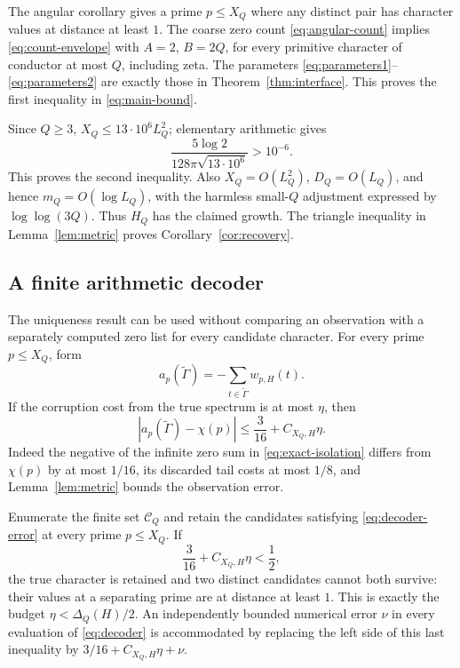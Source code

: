 \documentclass[11pt,letterpaper]{article}
\theoremstyle{definition}\newtheorem{definition}[theorem]{Definition}
\theoremstyle{remark}\newtheorem{remark}[theorem]{Remark}
\newcommand{\Ccal}{\mathcal C}
\begin{document}
The angular corollary gives a prime $p\le X_Q$ where any distinct
pair has character values at distance at least $1$. The coarse zero
count \eqref{eq:angular-count} implies \eqref{eq:count-envelope}
with $A=2$, $B=2Q$, for every primitive character of conductor at most
$Q$, including zeta. The parameters \eqref{eq:parameters1}--
\eqref{eq:parameters2} are exactly those in
Theorem~\ref{thm:interface}. This proves the first inequality in
\eqref{eq:main-bound}.

Since $Q\ge3$, $X_Q\le13\cdot10^6L_Q^2$; elementary arithmetic gives
\[
 \frac{5\log2}{128\pi\sqrt{13\cdot10^6}}>10^{-6}.
\]
This proves the second inequality. Also
$X_Q=O(L_Q^2)$, $D_Q=O(L_Q)$, and hence
$m_Q=O(\log L_Q)$, with the harmless small-$Q$ adjustment expressed by
$\log\log(3Q)$. Thus $H_Q$ has the claimed growth.
The triangle inequality in Lemma~\ref{lem:metric} proves
Corollary~\ref{cor:recovery}.

\subsection{A finite arithmetic decoder}

The uniqueness result can be used without comparing an observation
with a separately computed zero list for every candidate character.
For every prime $p\le X_Q$, form
\begin{equation}\label{eq:decoder}
 a_p(\widetilde\Gamma)=-\sum_{t\in\widetilde\Gamma}w_{p,H}(t).
\end{equation}
If the corruption cost from the true spectrum is at most $\eta$, then
\begin{equation}\label{eq:decoder-error}
 |a_p(\widetilde\Gamma)-\chi(p)|
 \le\frac3{16}+C_{X_Q,H}\eta.
\end{equation}
Indeed the negative of the infinite zero sum in \eqref{eq:exact-isolation} differs from
$\chi(p)$ by at most $1/16$, its discarded tail costs at most $1/8$,
and Lemma~\ref{lem:metric} bounds the observation error.

Enumerate the finite set $\Ccal_Q$ and retain the candidates satisfying
\eqref{eq:decoder-error} at every prime $p\le X_Q$. If
\[
 \frac3{16}+C_{X_Q,H}\eta<\frac12,
\]
the true character is retained and two distinct candidates cannot
both survive: their values at a separating prime are at distance at
least $1$. This is exactly the budget $\eta<\Delta_Q(H)/2$.
An independently bounded numerical error $\nu$ in every evaluation of
\eqref{eq:decoder} is accommodated by replacing the left side of this
last inequality by $3/16+C_{X_Q,H}\eta+\nu$.
\end{document}
